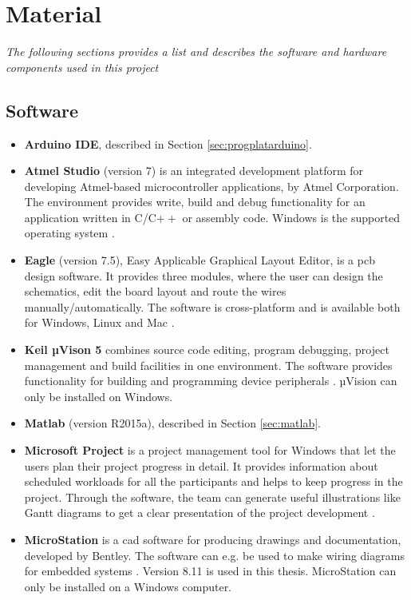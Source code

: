 \chapter{Material}
\textit{The following sections provides a list and describes the software and hardware components used in this project}
\section{Software}
\label{sec:software}
\begin{itemize}
    \item \textbf{Arduino IDE}, described in Section \ref{sec:progplatarduino}.
    \item \textbf{Atmel Studio} (version 7) is an integrated development platform for developing Atmel-based microcontroller applications, by Atmel Corporation. The environment provides write, build and debug functionality for an application written in C/C$++$ or assembly code. Windows is the supported operating system \cite{atmel}. 
    \item \textbf{Eagle} (version 7.5), Easy Applicable Graphical Layout Editor, is a \acrfull{pcb} design software. It provides three modules, where the user can design the schematics, edit the board layout and route the wires manually/automatically. The software is cross-platform and is available both for Windows, Linux and Mac \cite{eagle}.
    \item \textbf{Keil µVison 5} combines source code editing, program debugging, project management and build facilities in one environment. The software provides functionality for building and programming device peripherals \cite{uvision}. µVision can only be installed on Windows.
    \item \textbf{Matlab} (version R2015a), described in Section \ref{sec:matlab}.
    \item \textbf{Microsoft Project} is a project management tool for Windows that let the users plan their project progress in detail. It provides information about scheduled workloads for all the participants and helps to keep progress in the project. Through the software, the team can generate useful illustrations like Gantt diagrams to get a clear presentation of the project development \cite{msproject}. 
    \item \textbf{MicroStation} is a \acrfull{cad} software for producing drawings and documentation, developed by Bentley. The software can e.g. be used to make wiring diagrams for embedded systems \cite{microstation}. Version 8.11 is used in this thesis. MicroStation can only be installed on a Windows computer.

\end{itemize}

